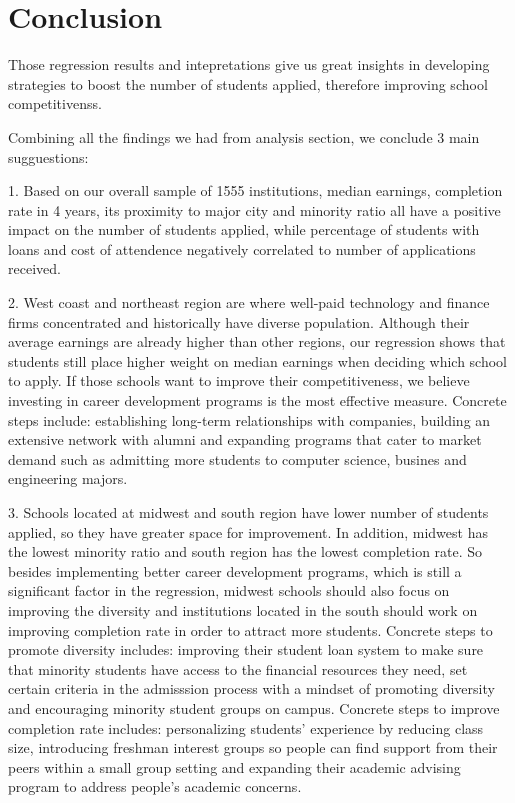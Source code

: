 \documentclass{article}
\begin{document}
\section{Conclusion}

Those regression results and intepretations give us great insights in developing strategies to boost the number of students applied, therefore improving school competitivenss. 

Combining all the findings we had from analysis section, we conclude 3 main sugguestions:

1. Based on our overall sample of 1555 institutions, median earnings, completion rate in 4 years, its proximity to major city and minority ratio all have a positive impact on the number of students applied, while percentage of students with loans and cost of attendence negatively correlated to number of applications received. 

2. West coast and northeast region are where well-paid technology and finance firms concentrated and historically have diverse population. Although their average earnings are already higher than other regions, our regression shows that students still place higher weight on median earnings when deciding which school to apply. If those schools want to improve their competitiveness, we believe investing in career development programs is the most effective measure. Concrete steps include: establishing long-term relationships with companies, building an extensive network with alumni and expanding programs that cater to market demand such as admitting more students to computer science, busines and engineering majors. 

3. Schools located at midwest and south region have lower number of students applied, so they have greater space for improvement. In addition, midwest has the lowest minority ratio and south region has the lowest completion rate. So besides implementing better career development programs, which is still a significant factor in the regression, midwest schools should also focus on improving the diversity and institutions located in the south should work on improving completion rate in order to attract more students. Concrete steps to promote diversity includes: improving their student loan system to make sure that minority students have access to the financial resources they need, set certain criteria in the admisssion process with a mindset of promoting diversity and encouraging minority student groups on campus. Concrete steps to improve completion rate includes: personalizing students' experience by reducing class size, introducing freshman interest groups so people can find support from their peers within a small group setting and expanding their academic advising program to address people's academic concerns.  
\end{document}
